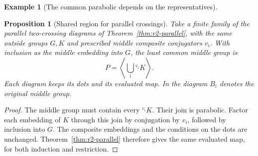 \documentclass[11pt,a4paper]{article}
\numberwithin{equation}{section}
\newtheorem{proposition}[theorem]{Proposition}
\theoremstyle{definition}
\newtheorem{example}{Example}[section]
\newcommand{\cg}[2]{{}^{#1}\!#2}
\begin{document}
\begin{example}[The common parabolic depends on the representatives]
\begin{center}
\end{center}
\end{example}


\begin{proposition}[Shared region for parallel crossings]\label{prop:parabolic-common-parallel-two}
Take a finite family of the parallel two-crossing diagrams of
Theorem~\ref{thm:r2-parallel}, with the same outside groups \(G,K\)
and prescribed middle composite conjugators \(v_i\). With inclusion
as the middle embedding into \(G\), the least common middle group is
\[
 P=\left\langle\bigcup_i\cg{v_i}{K}\right\rangle.
\]
Each diagram keeps its dots and its evaluated map. In the diagram
\(B_i\) denotes the original middle group.
\end{proposition}

\begin{proof}
The middle group must contain every \(\cg{v_i}{K}\). Their join is
parabolic. Factor each embedding of \(K\) through this join by
conjugation by \(v_i\), followed by inclusion into \(G\). The
composite embeddings and the conditions on the dots are unchanged.
Theorem~\ref{thm:r2-parallel} therefore gives the same evaluated map,
for both induction and restriction.
\end{proof}
\end{document}
